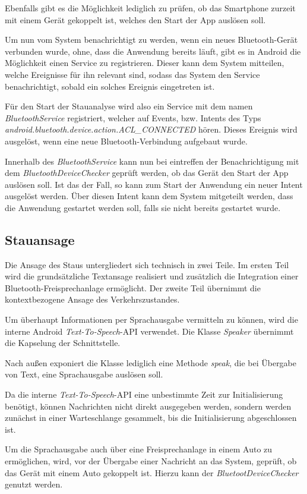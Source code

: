 Ebenfalls gibt es die Möglichkeit lediglich zu prüfen, ob das Smartphone zurzeit mit einem Gerät gekoppelt ist, welches den Start der App auslösen soll.

Um nun vom System benachrichtigt zu werden, wenn ein neues Bluetooth-Gerät verbunden wurde, ohne, dass die Anwendung bereits läuft, gibt es in Android die Möglichkeit einen Service zu registrieren.
Dieser kann dem System mitteilen, welche Ereignisse für ihn relevant sind, sodass das System den Service benachrichtigt, sobald ein solches Ereignis eingetreten ist.

Für den Start der Stauanalyse wird also ein Service mit dem namen {\em BluetoothService} registriert, welcher auf Events, bzw. Intents des Typs {\em android.bluetooth.device.action.ACL\_CONNECTED} hören. Dieses Ereignis wird ausgelöst, wenn eine neue Bluetooth-Verbindung aufgebaut wurde.

Innerhalb des {\em BluetoothService} kann nun bei eintreffen der Benachrichtigung mit dem {\em BluetoothDeviceChecker} geprüft werden, ob das Gerät den Start der App auslösen soll. Ist das der Fall, so kann zum Start der Anwendung ein neuer Intent ausgelöst werden. Über diesen Intent kann dem System mitgeteilt werden, dass die Anwendung gestartet werden soll, falls sie nicht bereits gestartet wurde.

\subsection{Stauansage}
Die Ansage des Staus untergliedert sich technisch in zwei Teile. Im ersten Teil wird die grundsätzliche Textansage realisiert und zusätzlich die Integration einer Bluetooth-Freisprechanlage ermöglicht.
Der zweite Teil übernimmt die kontextbezogene Ansage des Verkehrszustandes.

Um überhaupt Informationen per Sprachausgabe vermitteln zu können, wird die interne Android {\em Text-To-Speech}-API verwendet.
Die Klasse {\em Speaker} übernimmt die Kapselung der Schnittstelle.

Nach außen exponiert die Klasse lediglich eine Methode {\em speak}, die bei Übergabe von Text, eine Sprachausgabe auslösen soll.

Da die interne {\em Text-To-Speech}-API eine unbestimmte Zeit zur Initialisierung benötigt, können Nachrichten nicht direkt ausgegeben werden, sondern werden zunächst in einer Warteschlange gesammelt, bis die Initialisierung abgeschlossen ist.

Um die Sprachausgabe auch über eine Freisprechanlage in einem Auto zu ermöglichen, wird, vor der Übergabe einer Nachricht an das System, geprüft, ob das Gerät mit einem Auto gekoppelt ist. Hierzu kann der {\em BluetootDeviceChecker} genutzt werden.

